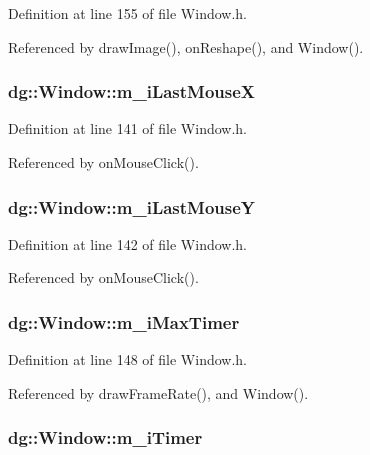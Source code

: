 Definition at line 155 of file Window.h.

Referenced by draw\-Image(), on\-Reshape(), and Window().
\subsubsection{ dg::Window::m\_\-i\-Last\-Mouse\-X\hspace{0.3cm}{\tt  [protected]}}\label{classdg_1_1Window_n4}




Definition at line 141 of file Window.h.

Referenced by on\-Mouse\-Click().
\subsubsection{ dg::Window::m\_\-i\-Last\-Mouse\-Y\hspace{0.3cm}{\tt  [protected]}}\label{classdg_1_1Window_n5}




Definition at line 142 of file Window.h.

Referenced by on\-Mouse\-Click().
\subsubsection{ dg::Window::m\_\-i\-Max\-Timer\hspace{0.3cm}{\tt  [protected]}}\label{classdg_1_1Window_n9}




Definition at line 148 of file Window.h.

Referenced by draw\-Frame\-Rate(), and Window().
\subsubsection{ dg::Window::m\_\-i\-Timer\hspace{0.3cm}{\tt  [protected]}}\label{classdg_1_1Window_n8}





